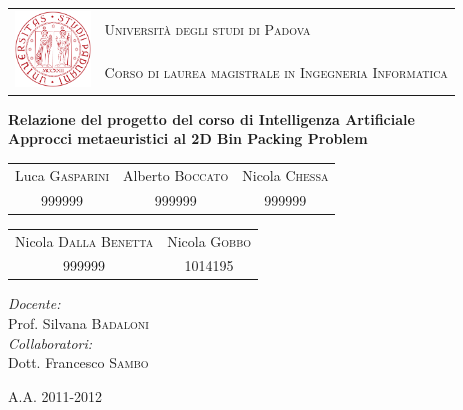 \thispagestyle{empty}
\begin{center}
	\leavevmode
	\large
	\begin{tabular}{ r l }
		\multirow{2}{*}{\includegraphics[width=2cm]{img/unipd_logo.png}} & \textsc{Università degli studi di Padova}\par \\
			& \textsc{Corso di laurea magistrale in Ingegneria Informatica} \\
	\end{tabular}
	\vskip 3cm
	
	\vfill
	\textbf{{\large Relazione del progetto del corso di Intelligenza Artificiale}}\\[0.2cm]
	\textbf{{\LARGE Approcci metaeuristici al 2D Bin Packing Problem}}\par
	\vskip 3cm
	\normalfont
	
	\begin{tabular}{ c c c }
		\large Luca \textsc{Gasparini} & Alberto \textsc{Boccato} &
				Nicola \textsc{Chessa} \\
		\normalsize 999999 & 999999 & 999999 \\
	\end{tabular}
	\vskip 0.5cm
	\begin{tabular}{ c c }
		\large Nicola \textsc{Dalla Benetta} & Nicola \textsc{Gobbo} \\
		\normalsize 999999 & 1014195 \\
	\end{tabular}
	\normalfont
	\vskip 4cm
	
	\begin{flushright}
		\emph{Docente:}\\
		Prof. Silvana \textsc{Badaloni}\\
	 \vskip 2cm
		\emph{Collaboratori:}\\
		Dott. Francesco \textsc{Sambo}\\
	\end{flushright}

	
	\vfill
	{\large A.A. 2011-2012}
\end{center}
\cleardoublepage